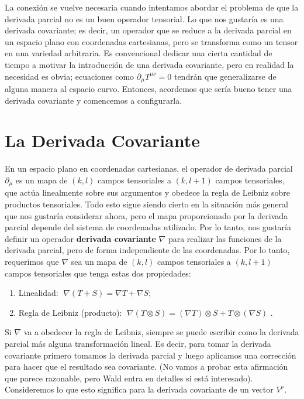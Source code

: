 \documentclass[11pt,b5paper,openany,twoside]{book}
\newcommand{\mn}{{\mu\nu}}
\newcommand{\p}[1]{{\partial_{#1}}}
\begin{document}
La conexión se vuelve necesaria cuando intentamos abordar el problema de que la derivada parcial no es un buen operador tensorial.
Lo que nos gustaría es una derivada covariante; es decir, un operador que se reduce a la derivada parcial en un espacio plano con coordenadas cartesianas, pero se transforma como un tensor en una variedad arbitraria.
Es convencional dedicar una cierta cantidad de tiempo a motivar la introducción de una derivada covariante, pero en realidad la necesidad es obvia; ecuaciones como $\p\mu T^{\mn}=0$ tendrán que generalizarse de alguna manera al espacio curvo.
Entonces, acordemos que sería bueno tener una derivada covariante y comencemos a configurarla.

\section{La Derivada Covariante}

En un espacio plano en coordenadas cartesianas, el operador de derivada parcial $\p\mu$ es un mapa de $(k,l)$ campos tensoriales a $(k,l+1)$ campos tensoriales, que actúa linealmente sobre sus argumentos y obedece la regla de Leibniz sobre productos tensoriales.
Todo esto sigue siendo cierto en la situación más general que nos gustaría considerar ahora, pero el mapa proporcionado por la derivada parcial depende del sistema de coordenadas utilizado.
Por lo tanto, nos gustaría definir un operador {\bf derivada covariante} $\nabla$ para realizar las funciones de la derivada parcial, pero de forma independiente de las coordenadas.
Por lo tanto, requerimos que $\nabla$ sea un mapa de $(k,l)$ campos tensoriales a $(k,l+1)$ campos tensoriales que tenga estas dos propiedades:

\begin{enumerate}
\item Linealidad: $\;\nabla(T+S) = \nabla T + \nabla S$;
\item Regla de Leibniz (producto): $\;\nabla(T\otimes S) = (\nabla T)\otimes S + T\otimes (\nabla S)$ .
\end{enumerate}

Si $\nabla$ va a obedecer la regla de Leibniz, siempre se puede escribir como la derivada parcial más alguna transformación lineal.
Es decir, para tomar la derivada covariante primero tomamos la derivada parcial y luego aplicamos una corrección para hacer que el resultado sea covariante.
(No vamos a probar esta afirmación que parece razonable, pero Wald entra en detalles si está interesado).
Consideremos lo que esto significa para la derivada covariante de un vector $V^\nu$.
\end{document}
